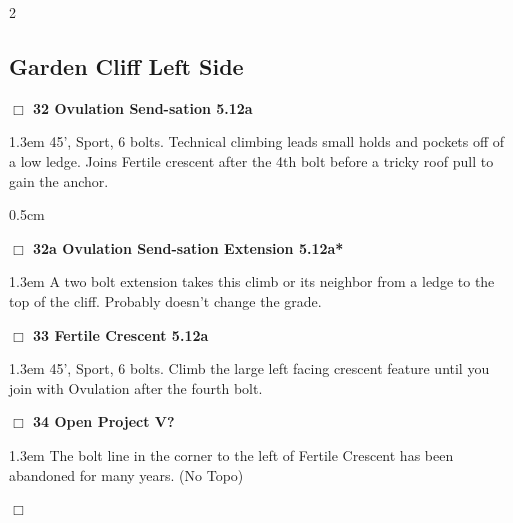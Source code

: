 	\begin{multicols}{2}
\needspace{10em}
\subsection*{Garden Cliff Left Side}\label{bf:Garden Cliff Left Side}
\needspace{2em}
\label{rt:Ovulation Send-sation}
\colorbox{Goldenrod!20}{
\parbox{0.95\linewidth}{
\hspace{-1ex}\textbf{$\Box$
32 Ovulation Send-sation 5.12a  
}}}
\begin{adjustwidth}{1.3em}{}			
45', Sport, 6 bolts. Technical climbing leads small holds and pockets off of a low ledge. Joins Fertile crescent after the 4th bolt before a tricky roof pull to gain the anchor.
\end{adjustwidth}
\begin{adjustwidth}{0.5cm}{}				
\needspace{4em}
\needspace{2em}
\label{vr:Ovulation Send-sation Extension}
\colorbox{Goldenrod!20}{
\parbox{0.95\linewidth}{
\hspace{-1ex}\textbf{$\Box$
32a Ovulation Send-sation Extension 5.12a*  
}}}
\begin{adjustwidth}{1.3em}{}			
A two bolt extension takes this climb or its neighbor from a ledge to the top of the cliff. Probably doesn't change the grade.
\end{adjustwidth}
\end{adjustwidth}
\needspace{2em}
\label{rt:Fertile Crescent}
\colorbox{Goldenrod!20}{
\parbox{0.95\linewidth}{
\hspace{-1ex}\textbf{$\Box$
33 Fertile Crescent 5.12a  
}}}
\begin{adjustwidth}{1.3em}{}			
45', Sport, 6 bolts. Climb the large left facing crescent feature until you join with Ovulation after the fourth bolt.
\end{adjustwidth}
\needspace{2em}
\label{rt:cliffs_proj_4}
\colorbox{black!20}{
\parbox{0.95\linewidth}{
\hspace{-1ex}\textbf{$\Box$
34 Open Project V?  
}}}
\begin{adjustwidth}{1.3em}{}			
The bolt line in the corner to the left of Fertile Crescent has been abandoned for many years.
  (No Topo)
\end{adjustwidth}
\needspace{2em}
\label{rt:My Secret Garden}
\colorbox{RoyalBlue!20}{
\parbox{0.95\linewidth}{
\hspace{-1ex}\textbf{$\Box$
}}}
\end{multicols}
